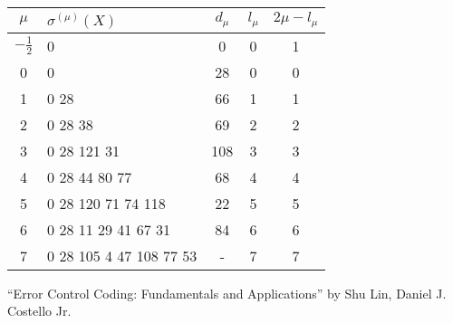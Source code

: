\documentclass[a4paper]{article}
\begin{document}
\begin{center}
  	\begin{tabular}{ c | l | c | c | c }
        \toprule
        $\mu$ & $\sigma^{(\mu)}(X)$ & $d_{\mu}$ & $l_{\mu}$ & $2\mu - l_{\mu}$ \\ \hline
        $-\frac{1}{2}$ & 0 & 0 & 0 & 1 \\ \hline
        0 & 0 & 28 & 0 & 0 \\ \hline
        1 & 0 28 & 66 & 1 & 1 \\ \hline
        2 & 0 28 38 & 69 & 2 & 2 \\ \hline
        3 & 0 28 121 31 & 108 & 3 & 3 \\ \hline
        4 & 0 28 44 80 77 & 68 & 4 & 4 \\ \hline
        5 & 0 28 120 71 74 118 & 22 & 5 & 5 \\ \hline
        6 & 0 28 11 29 41 67 31 & 84 & 6 & 6 \\ \hline
        7 & 0 28 105 4 47 108 77 53 & - & 7 & 7 \\
		\bottomrule
    \end{tabular}
\end{center}


\begin{thebibliography}{9}
  ``Error Control Coding: Fundamentals and Applications'' by Shu Lin, Daniel J. Costello Jr.
\end{thebibliography}
\end{document}
